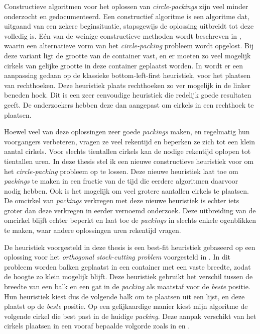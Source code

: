 \documentclass[12pt,a4paper,oneside]{book}
\begin{document}
Constructieve algoritmen voor het oplossen van \textit{circle-packings} zijn veel minder onderzocht en gedocumenteerd.
Een constructief algoritme is een algoritme dat, uitgaand van een zekere beginsituatie, stapsgewijs de oplossing uitbreidt tot deze volledig is.
Eén van de weinige constructieve methoden wordt beschreven in \cite{akeb2006basic}, waarin een alternatieve vorm van het \textit{circle-packing} probleem wordt opgelost. Bij deze variant ligt de grootte van de container vast, en er moeten zo veel mogelijk cirkels van gelijke grootte in deze container geplaatst worden.
In \cite{hifi2004approximate} wordt er een aanpassing gedaan op de klassieke bottom-left-first heuristiek, voor het plaatsen van rechthoeken.
Deze heuristiek plaats rechthoeken zo ver mogelijk in de linker beneden hoek.
Dit is een zeer eenvoudige heuristiek die redelijk goede resultaten geeft.
De onderzoekers hebben deze dan aangepast om cirkels in een rechthoek te plaatsen.

Hoewel veel van deze oplossingen zeer goede \textit{packings} maken, en regelmatig hun voorgangers verbeteren, vragen ze veel rekentijd en beperken ze zich tot een klein aantal cirkels.
Voor slechts tientallen cirkels kan de nodige rekentijd oplopen tot tientallen uren.
In deze thesis stel ik een nieuwe constructieve heuristiek voor om het \textit{circle-packing} probleem op te lossen.
Deze nieuwe heuristiek laat toe om \textit{packings} te maken in een fractie van de tijd die eerdere algoritmen daarvoor nodig hebben.
Ook is het mogelijk om veel grotere aantallen cirkels te plaatsen.
De omcirkel van \textit{packings} verkregen met deze nieuwe heuristiek is echter iets groter dan deze verkregen in eerder vernoemd onderzoek.
Deze uitbreiding van de omcirkel blijft echter beperkt en laat toe de \textit{packings} in slechts enkele ogenblikken te maken, waar andere oplossingen uren rekentijd vragen.

De heuristiek voorgesteld in deze thesis is een best-fit heuristiek gebaseerd op een oplossing voor het \textit{orthogonal stock-cutting problem} voorgesteld in \cite{burke2004new}.
In dit probleem worden balken geplaatst in een container met een vaste breedte, zodat de hoogte zo klein mogelijk blijft.
Deze heuristiek gebruikt het verschil tussen de breedte van een balk en een gat in de \textit{packing} als maatstaf voor de \textit{beste} positie.
Hun heuristiek kiest dus de volgende balk om te plaatsen uit een lijst, en deze plaatst op de \textit{beste} positie.
Op een gelijkaardige manier kiest mijn algoritme de volgende cirkel die best past in de huidige \textit{packing}.
Deze aanpak verschikt van het cirkels plaatsen in een vooraf bepaalde volgorde zoals in \cite{grosso2010} en \cite{jors2011}.
\end{document}
